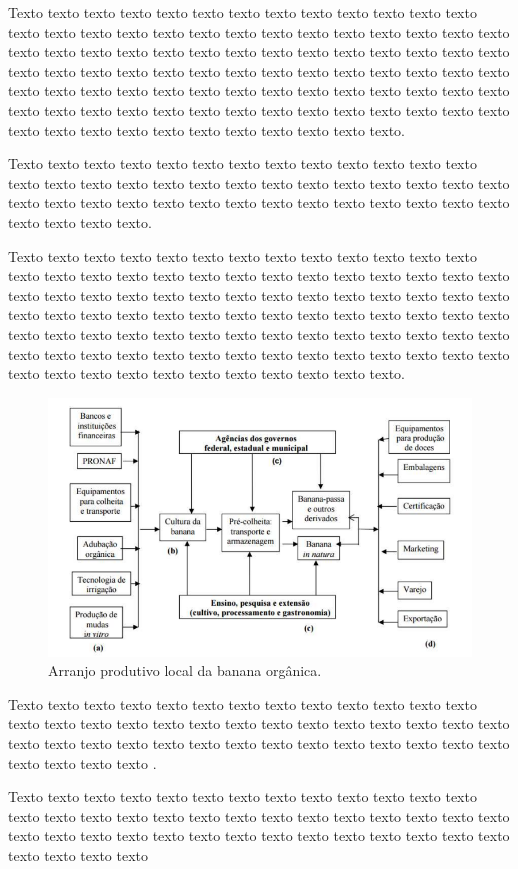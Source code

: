 Texto texto texto texto texto texto texto texto texto texto texto texto texto texto 
texto texto texto texto texto texto texto texto texto texto texto texto texto texto texto 
texto texto texto texto texto texto texto texto texto texto texto texto texto texto texto 
texto texto texto texto texto texto texto texto texto texto texto texto texto texto texto 
texto texto texto texto texto texto texto texto texto texto texto texto texto texto texto 
texto texto texto texto texto texto texto texto texto texto texto texto texto texto texto 
texto texto texto texto texto. 

Texto texto texto texto texto texto texto texto texto texto texto texto texto texto 
texto texto texto texto texto texto texto texto texto texto texto texto texto texto texto 
texto texto texto texto texto texto texto texto texto texto texto texto texto texto texto 
texto. 

Texto texto texto texto texto texto texto texto texto texto texto texto texto texto texto texto texto texto texto texto texto texto texto texto texto texto texto texto texto texto texto texto texto texto texto texto texto texto texto texto texto texto texto texto texto texto texto texto texto texto texto texto texto texto texto texto texto texto texto texto texto texto texto texto texto texto texto texto texto texto texto texto texto texto texto texto texto texto texto texto texto texto texto texto texto texto texto texto texto texto texto texto texto texto. 



\begin{figure}[H]
	\caption{\label{fig_arranjo}Arranjo produtivo local da banana orgânica.}
	\begin{center}
	    \includegraphics[scale=1.0]{imagens/fig_exemplo.png}
	\end{center}
\end{figure}


Texto texto texto texto texto texto texto texto texto texto texto texto texto texto 
texto texto texto texto texto texto texto texto texto texto texto texto texto texto texto 
texto texto texto texto texto texto texto texto texto texto texto texto texto texto texto 
texto \cite{limaarranjo}. 

Texto texto texto texto texto texto texto texto texto texto texto texto texto texto 
texto texto texto texto texto texto texto texto texto texto texto texto texto texto texto 
texto texto texto texto texto texto texto texto texto texto texto texto texto texto texto 
texto
